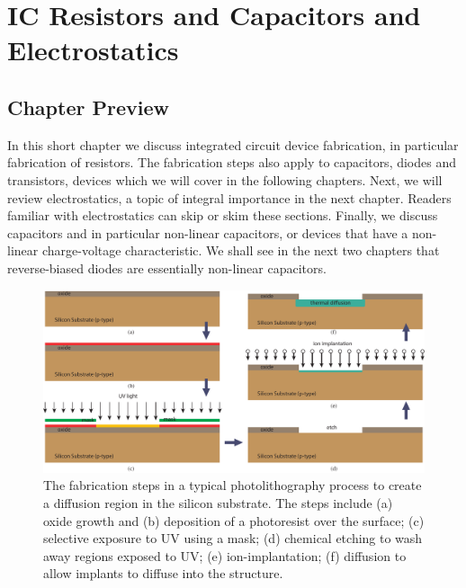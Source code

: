 \chapter{IC Resistors and Capacitors and Electrostatics}
\label{ch:ch04_ic_tech}
\graphicspath{{./figures/figs_ch04_ic_tech/}}
\section{Chapter Preview}
In this short chapter we discuss integrated circuit device fabrication, in particular fabrication of resistors.  The fabrication steps also apply to capacitors, diodes and transistors, devices which we will cover in the following chapters.  Next, we will review electrostatics, a topic of integral importance in the next chapter.  Readers familiar with electrostatics can skip or skim these sections.  Finally, we discuss capacitors and in particular non-linear capacitors, or devices that have a non-linear charge-voltage characteristic.  We shall see in the next two chapters that reverse-biased diodes are essentially non-linear capacitors.
\newpage
\begin{figure}[t]
\centering
\includegraphics[width=\columnwidth]{process_steps}
\caption{The fabrication steps in a typical photolithography process to create a diffusion region in the silicon substrate.  The steps include (a) oxide growth and (b) deposition of a photoresist over the surface; (c) selective exposure to UV using a mask; (d) chemical etching to wash away regions exposed to UV; (e) ion-implantation; (f) diffusion to allow implants to diffuse into the structure.} \label{fig:mod2-2_ICtech_sld_4}
\end{figure}
